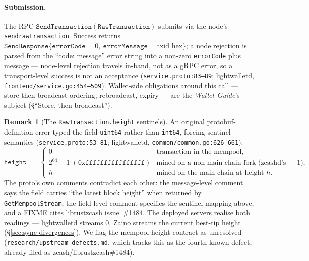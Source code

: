 \documentclass[11pt,a4paper]{article}
\theoremstyle{definition}
\newtheorem{remark}[theorem]{Remark}
\begin{document}
\paragraph{Submission.} The RPC
$\mathtt{SendTransaction}(\mathtt{RawTransaction})$ submits via the
node's \texttt{sendrawtransaction}. Success returns
$\mathtt{SendResponse}\{\mathtt{errorCode}{=}0,\
\mathtt{errorMessage}{=}\text{txid hex}\}$; a node rejection is parsed
from the ``code: message'' error string into a non-zero
\texttt{errorCode} plus message --- node-level rejection travels in-band,
not as a gRPC error, so a transport-level success is not an acceptance
(\texttt{service.proto:83--89}; \textsf{lightwalletd},
\texttt{frontend/service.go:454--509}). Wallet-side obligations around
this call --- store-then-broadcast ordering, rebroadcast, expiry --- are
the \emph{Wallet Guide}'s subject (\S``Store, then broadcast'').

\begin{remark}[The \texttt{RawTransaction.height} sentinels]
\label{rem:sync-height-sentinel}
An original protobuf-definition error typed the field \texttt{uint64}
rather than \texttt{int64}, forcing sentinel semantics
(\texttt{service.proto:53--81}; \textsf{lightwalletd},
\texttt{common/common.go:626--661}):
\[
\mathtt{height} \;=\;
\begin{cases}
0 & \text{transaction in the mempool,}\\
2^{64}-1 \; (\mathtt{0xffffffffffffffff}) &
  \text{mined on a non-main-chain fork (zcashd's } -1\text{),}\\
h & \text{mined on the main chain at height } h.
\end{cases}
\]
The proto's own comments contradict each other: the message-level comment
says the field carries ``the latest block height'' when returned by
\texttt{GetMempoolStream}, the field-level comment specifies the sentinel
mapping above, and a FIXME cites librustzcash issue~\#1484. The deployed
servers realise both readings --- lightwalletd streams $0$, Zaino streams
the current best-tip height (\S\ref{sec:sync-divergences}). We flag the
mempool-height contract as unresolved
(\texttt{research/upstream-defects.md}, which tracks this as the fourth
known defect, already filed as zcash/librustzcash\#1484).
\end{remark}
\end{document}
